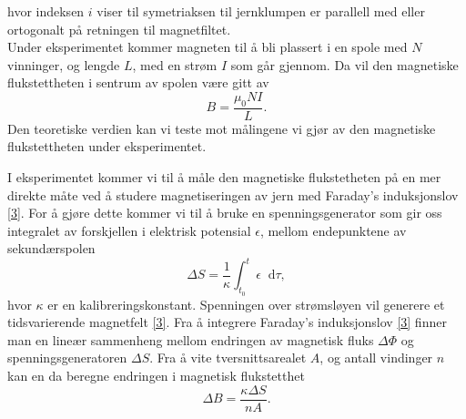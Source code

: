 \documentclass[%
 reprint,
 amsmath,amssymb,
 aps,
]{revtex4-1}
\newcommand*\diff{\mathop{}\!\mathrm{d}}
\begin{document}
hvor indeksen $i$ viser til symetriaksen til jernklumpen er parallell med eller ortogonalt på retningen til magnetfiltet.
\\Under eksperimentet kommer magneten til å bli plassert i en spole med $N$ vinninger, og lengde $L$, med en strøm $I$ som går gjennom. Da vil den magnetiske flukstettheten i sentrum av spolen være gitt av
\begin{equation}
  B = \frac{\mu_0NI}{L}. \label{nice_b}
\end{equation}Den teoretiske verdien kan vi teste mot målingene vi gjør av den magnetiske flukstettheten under eksperimentet.
\par
I eksperimentet kommer vi til å måle den magnetiske flukstetheten på en mer direkte måte ved å studere magnetiseringen av jern med Faraday's induksjonslov \eqref{3}. For å gjøre dette kommer vi til å bruke en spenningsgenerator som gir oss integralet av forskjellen i elektrisk potensial $\epsilon$, mellom endepunktene av sekundærspolen
\begin{equation}
  \Delta S = \frac{1}{\kappa}\int_{t_0}^{t}\epsilon \diff \tau, \label{deltas}
\end{equation}
hvor $\kappa$ er en kalibreringskonstant. Spenningen over strømsløyen vil generere et tidsvarierende magnetfelt \eqref{3}. Fra å integrere Faraday's induksjonslov \eqref{3} finner man en lineær sammenheng mellom endringen av magnetisk fluks $\Delta \Phi$ og spenningsgeneratoren $\Delta S$. Fra å vite tversnittsarealet $A$, og antall vindinger $n$ kan en da beregne endringen i magnetisk flukstetthet
\begin{equation}
  \Delta B = \frac{\kappa\Delta S}{nA}.\label{deltab}
\end{equation}
\end{document}
